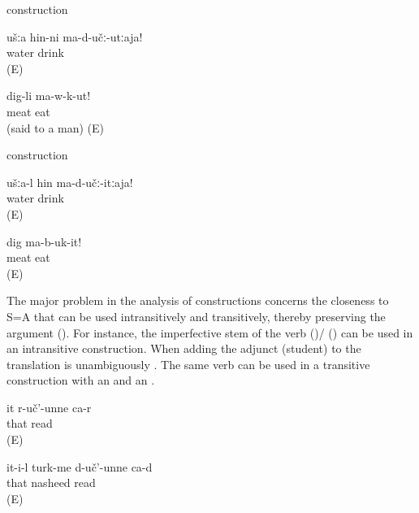 \begin{exe}
	\ex	{} construction	\label{ex:antipassive drink water}
	\begin{xlist}
		\ex	\label{ex:You do not drink water}
		\gll	ušːa hin-ni	ma-d-učː-utːaja!\\
				water	drink\\
		\glt	{} (E)
	
		\ex	\label{ex:Do (always) not eat meat!}
		\gll	dig-li ma-w-k-ut!\\
			meat eat\\
		\glt	{} (said to a man) (E)
	\end{xlist}\pagebreak
	
	\ex	{} construction	\label{ex: ergative drink water}
	\begin{xlist}
		\ex	\label{ex:You do not drink the water}
		\gll	ušːa-l		hin ma-d-učː-itːaja!\\
				water drink\\
		\glt	{} (E)
	
		\ex	\label{ex:Do not eat the meat!}
		\gll	dig ma-b-uk-it!\\
			meat	eat\\
		\glt	{} (E)
	\end{xlist}
\end{exe}

The major problem in the analysis of  constructions concerns the closeness to S=A  that can be used intransitively and transitively, thereby preserving the  argument (). For instance, the imperfective stem of the verb  ()\slash{} ()  can be used in an intransitive construction. When adding the  adjunct  (student) to  the translation is unambiguously . The same verb can be used in a transitive construction with an   and an   .

\begin{exe}
	\ex	\label{ex:She reads / studies}
	\gll	it	r-uč'-unne	ca-r\\
		that	read	\\
	\glt	{} (E)

	\ex	\label{ex:S/he reads (i.e. sings) nasheeds@varA}
	\gll	it-i-l	turk-me	d-uč'-unne	ca-d\\
		that	nasheed	read	\\
	\glt	{} (E)
\end{exe}

